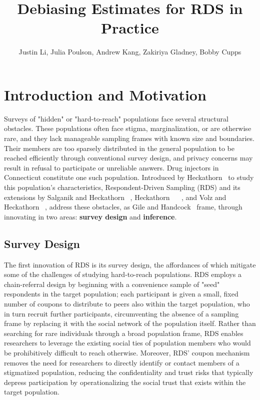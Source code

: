 \documentclass[11pt,a4paper,twocolumn,twoside]{rho-class/rho}
\title{Debiasing Estimates for RDS in Practice}
\author[1]{
    Justin Li,
    Julia Poulson,
    Andrew Kang,
    Zakiriya Gladney,
    Bobby Cupps
}
\begin{document}
    \maketitle
    \thispagestyle{firststyle}


\section{Introduction and Motivation}

Surveys of "hidden" or "hard-to-reach" populations face several structural obstacles. These populations often face stigma, marginalization, or are otherwise rare, and they lack manageable sampling frames with known size and boundaries. Their members are too sparsely distributed in the general population to be reached efficiently through conventional survey design, and privacy concerns may result in refusal to participate or unreliable answers. Drug injectors in Connecticut constitute one such population. Introduced by Heckathorn~\cite{heckathorn1997respondent} %
to study this population's characteristics, Respondent-Driven Sampling (RDS) and its extensions by Salganik and Heckathorn~\cite{salganik2004sampling}
, Heckathorn~\cite{heckathorn2002respondent} ~\cite{heckathorn2007extensions}
, and Volz and Heckathorn~\cite{volz2008probability} 
, address these obstacles, as Gile and Handcock~\cite{gile2010respondent}
 frame, through innovating in two areas: \textbf{survey design} and \textbf{inference}. 

\subsection{Survey Design}
The first innovation of RDS is its survey design, the affordances of which mitigate some of the challenges of studying hard-to-reach populations. RDS employs a chain-referral design by beginning with a convenience sample of "seed" respondents in the target population; each participant is given a small, fixed number of coupons to distribute to peers also within the target population, who in turn recruit further participants, circumventing the absence of a sampling frame by replacing it with the social network of the population itself. Rather than searching for rare individuals through a broad population frame, RDS enables researchers to leverage the existing social ties of population members who would be prohibitively difficult to reach otherwise. Moreover, RDS' coupon mechanism removes the need for researchers to directly identify or contact members of a stigmatized population, reducing the confidentiality and trust risks that typically depress participation by operationalizing the social trust that exists within the target population. 
\end{document}
